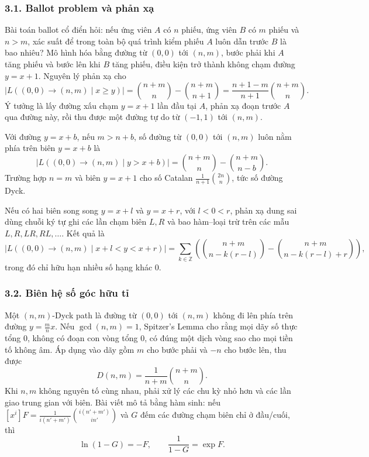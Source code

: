\documentclass[11pt]{article}
\begin{document}
\subsubsection*{3.1. Ballot problem và phản xạ}

Bài toán ballot cổ điển hỏi: nếu ứng viên \(A\) có \(n\) phiếu, ứng viên \(B\)
có \(m\) phiếu và \(n>m\), xác suất để trong toàn bộ quá trình kiểm phiếu
\(A\) luôn dẫn trước \(B\) là bao nhiêu? Mô hình hóa bằng đường từ \((0,0)\)
tới \((n,m)\), bước phải khi \(A\) tăng phiếu và bước lên khi \(B\) tăng phiếu,
điều kiện trở thành không chạm đường \(y=x+1\). Nguyên lý phản xạ cho
\[
  |L((0,0)\to(n,m)\mid x\ge y)|
  =
  \binom{n+m}{n}-\binom{n+m}{n+1}
  =
  \frac{n+1-m}{n+1}\binom{n+m}{n}.
\]
Ý tưởng là lấy đường xấu chạm \(y=x+1\) lần đầu tại \(A\), phản xạ đoạn trước
\(A\) qua đường này, rồi thu được một đường tự do từ \((-1,1)\) tới \((n,m)\).

Với đường \(y=x+b\), nếu \(m>n+b\), số đường từ \((0,0)\) tới \((n,m)\) luôn
nằm phía trên biên \(y=x+b\) là
\[
  |L((0,0)\to(n,m)\mid y>x+b)|
  =
  \binom{n+m}{n}-\binom{n+m}{n-b}.
\]
Trường hợp \(n=m\) và biên \(y=x+1\) cho số Catalan
\(\frac1{n+1}\binom{2n}{n}\), tức số đường Dyck.

Nếu có hai biên song song \(y=x+l\) và \(y=x+r\), với \(l<0<r\), phản xạ
dung sai dùng chuỗi ký tự ghi các lần chạm biên \(L,R\) và bao hàm--loại trừ
trên các mẫu \(L,R,LR,RL,\ldots\). Kết quả là
\[
  |L((0,0)\to(n,m)\mid x+l<y<x+r)|
  =
  \sum_{k\in\mathbb Z}
  \left(
    \binom{n+m}{n-k(r-l)}
    -
    \binom{n+m}{n-k(r-l)+r}
  \right),
\]
trong đó chỉ hữu hạn nhiều số hạng khác \(0\).


\subsubsection*{3.2. Biên hệ số góc hữu tỉ}

Một \((n,m)\)-Dyck path là đường từ \((0,0)\) tới \((n,m)\) không đi lên phía
trên đường \(y=\frac mnx\). Nếu \(\gcd(n,m)=1\), Spitzer's Lemma cho rằng mọi
dãy số thực tổng \(0\), không có đoạn con vòng tổng \(0\), có đúng một dịch
vòng sao cho mọi tiền tố không âm. Áp dụng vào dãy gồm \(m\) cho bước phải và
\(-n\) cho bước lên, thu được
\[
  D(n,m)=\frac1{n+m}\binom{n+m}{n}.
\]
Khi \(n,m\) không nguyên tố cùng nhau, phải xử lý các chu kỳ nhỏ hơn và các
lần giao trung gian với biên. Bài viết mô tả bằng hàm sinh: nếu
\([x^i]F=\frac1{i(n'+m')}\binom{i(n'+m')}{in'}\) và \(G\) đếm các đường chạm
biên chỉ ở đầu/cuối, thì
\[
  \ln(1-G)=-F,\qquad \frac1{1-G}=\exp F.
\]
\end{document}
